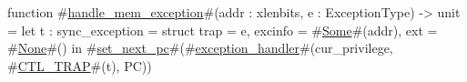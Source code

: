 function #\hyperref[sailRISCVzhandlezymemzyexception]{handle\_mem\_exception}#(addr : xlenbits, e : ExceptionType) -> unit = {
  let t : sync_exception = struct { trap    = e,
                                    excinfo = #\hyperref[sailRISCVzSome]{Some}#(addr),
                                    ext     = #\hyperref[sailRISCVzNone]{None}#() } in
  #\hyperref[sailRISCVzsetzynextzypc]{set\_next\_pc}#(#\hyperref[sailRISCVzexceptionzyhandler]{exception\_handler}#(cur_privilege, #\hyperref[sailRISCVzCTLzyTRAP]{CTL\_TRAP}#(t), PC))
}
